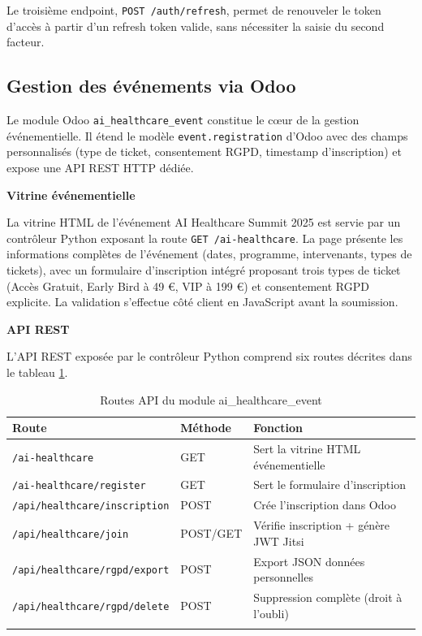 Le troisième endpoint, \texttt{POST /auth/refresh}, permet de renouveler le token d'accès à partir d'un refresh token valide, sans nécessiter la saisie du second facteur.

\subsection{Gestion des événements via Odoo}
Le module Odoo \texttt{ai\_healthcare\_event} constitue le c\oe{}ur de la gestion événementielle. Il étend le modèle \texttt{event.registration} d'Odoo avec des champs personnalisés (type de ticket, consentement RGPD, timestamp d'inscription) et expose une API REST HTTP dédiée.

\textbf{Vitrine événementielle}

La vitrine HTML de l'événement AI Healthcare Summit 2025 est servie par un contrôleur Python exposant la route \texttt{GET /ai-healthcare}. La page présente les informations complètes de l'événement (dates, programme, intervenants, types de tickets), avec un formulaire d'inscription intégré proposant trois types de ticket (Accès Gratuit, Early Bird à 49 €, VIP à 199 €) et consentement RGPD explicite. La validation s'effectue côté client en JavaScript avant la soumission.

\textbf{API REST}

L'API REST exposée par le contrôleur Python comprend six routes décrites dans le tableau \ref{tab:routes}.

\begin{longtable}{|m{5cm}|m{2cm}|m{6cm}|}
\hline
\textbf{Route} & \textbf{Méthode} & \textbf{Fonction} \\
\hline
\endhead
\endfoot
\endlastfoot
\hline
\texttt{/ai-healthcare} & GET & Sert la vitrine HTML événementielle \\
\hline
\texttt{/ai-healthcare/register} & GET & Sert le formulaire d'inscription \\
\hline
\texttt{/api/healthcare/inscription} & POST & Crée l'inscription dans Odoo \\
\hline
\texttt{/api/healthcare/join} & POST/GET & Vérifie inscription + génère JWT Jitsi \\
\hline
\texttt{/api/healthcare/rgpd/export} & POST & Export JSON données personnelles \\
\hline
\texttt{/api/healthcare/rgpd/delete} & POST & Suppression complète (droit à l'oubli) \\
\hline
\captionsetup{justification=centering,margin=2cm}
\caption{Routes API du module ai\_healthcare\_event}
\label{tab:routes}
\end{longtable}

